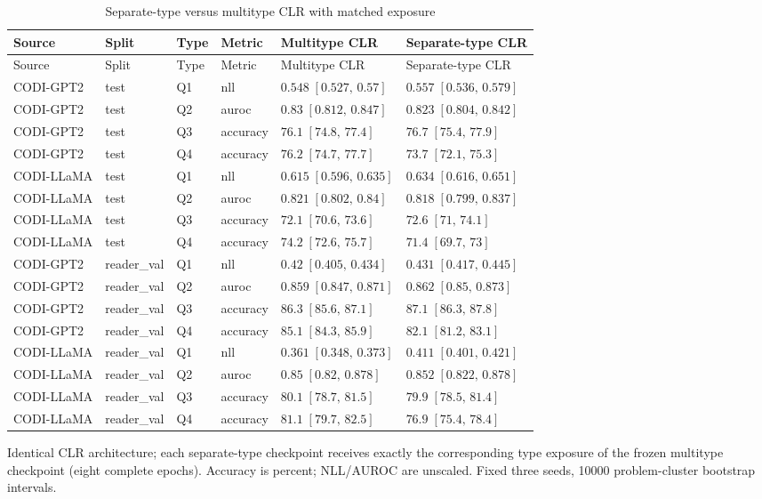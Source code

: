 \begingroup\scriptsize\setlength{\tabcolsep}{3pt}
\begin{longtable}{@{}p{}p{}p{}p{}p{}p{}@{}}
\caption{Separate-type versus multitype CLR with matched exposure}\label{tab:appendix-per-type}\\
\toprule
Source & Split & Type & Metric & Multitype CLR & Separate-type CLR \\
\midrule\endfirsthead
\toprule
Source & Split & Type & Metric & Multitype CLR & Separate-type CLR \\
\midrule\endhead
CODI-GPT2 & test & Q1 & nll & $0.548\;[0.527,\,0.57]$ & $0.557\;[0.536,\,0.579]$ \\
CODI-GPT2 & test & Q2 & auroc & $0.83\;[0.812,\,0.847]$ & $0.823\;[0.804,\,0.842]$ \\
CODI-GPT2 & test & Q3 & accuracy & $76.1\;[74.8,\,77.4]$ & $76.7\;[75.4,\,77.9]$ \\
CODI-GPT2 & test & Q4 & accuracy & $76.2\;[74.7,\,77.7]$ & $73.7\;[72.1,\,75.3]$ \\
CODI-LLaMA & test & Q1 & nll & $0.615\;[0.596,\,0.635]$ & $0.634\;[0.616,\,0.651]$ \\
CODI-LLaMA & test & Q2 & auroc & $0.821\;[0.802,\,0.84]$ & $0.818\;[0.799,\,0.837]$ \\
CODI-LLaMA & test & Q3 & accuracy & $72.1\;[70.6,\,73.6]$ & $72.6\;[71,\,74.1]$ \\
CODI-LLaMA & test & Q4 & accuracy & $74.2\;[72.6,\,75.7]$ & $71.4\;[69.7,\,73]$ \\
CODI-GPT2 & reader\_val & Q1 & nll & $0.42\;[0.405,\,0.434]$ & $0.431\;[0.417,\,0.445]$ \\
CODI-GPT2 & reader\_val & Q2 & auroc & $0.859\;[0.847,\,0.871]$ & $0.862\;[0.85,\,0.873]$ \\
CODI-GPT2 & reader\_val & Q3 & accuracy & $86.3\;[85.6,\,87.1]$ & $87.1\;[86.3,\,87.8]$ \\
CODI-GPT2 & reader\_val & Q4 & accuracy & $85.1\;[84.3,\,85.9]$ & $82.1\;[81.2,\,83.1]$ \\
CODI-LLaMA & reader\_val & Q1 & nll & $0.361\;[0.348,\,0.373]$ & $0.411\;[0.401,\,0.421]$ \\
CODI-LLaMA & reader\_val & Q2 & auroc & $0.85\;[0.82,\,0.878]$ & $0.852\;[0.822,\,0.878]$ \\
CODI-LLaMA & reader\_val & Q3 & accuracy & $80.1\;[78.7,\,81.5]$ & $79.9\;[78.5,\,81.4]$ \\
CODI-LLaMA & reader\_val & Q4 & accuracy & $81.1\;[79.7,\,82.5]$ & $76.9\;[75.4,\,78.4]$ \\
\bottomrule
\end{longtable}
\noindent Identical CLR architecture; each separate-type checkpoint receives exactly the corresponding type exposure of the frozen multitype checkpoint (eight complete epochs). Accuracy is percent; NLL/AUROC are unscaled. Fixed three seeds, 10000 problem-cluster bootstrap intervals.
\endgroup
